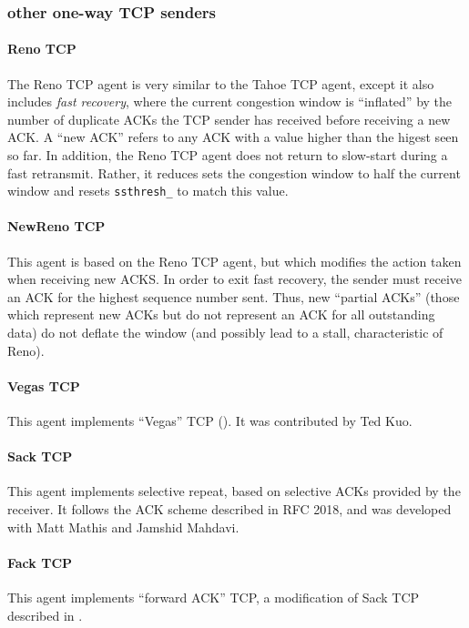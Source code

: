 \documentclass{article}
\begin{document}
\subsubsection{other one-way TCP senders}

\paragraph{Reno TCP}
The Reno TCP agent is very similar to the Tahoe TCP agent,
except it also includes {\em fast recovery}, where the current
congestion window is ``inflated'' by the number of duplicate ACKs
the TCP sender has received before receiving a new ACK.
A ``new ACK'' refers to any ACK with a value higher than the higest
seen so far.
In addition, the Reno TCP agent does not return to slow-start during
a fast retransmit.
Rather, it reduces sets the congestion window to half the current
window and resets {\tt ssthresh\_} to match this value.

\paragraph{NewReno TCP}
This agent is based on the Reno TCP agent, but which modifies the
action taken when receiving new ACKS.
In order to exit fast recovery, the sender must receive an ACK for the
highest sequence number sent.
Thus, new ``partial ACKs'' (those which represent new ACKs but do not
represent an ACK for all outstanding data) do not deflate the window
(and possibly lead to a stall, characteristic of Reno).

\paragraph{Vegas TCP}
This agent implements ``Vegas'' TCP (\cite{vegas}).
It was contributed by Ted Kuo.

\paragraph{Sack TCP}
This agent implements selective repeat, based on selective ACKs provided
by the receiver.
It follows the ACK scheme described in RFC 2018, and was developed
with Matt Mathis and Jamshid Mahdavi.

\paragraph{Fack TCP}
This agent implements ``forward ACK'' TCP, a modification of Sack
TCP described in \cite{matt-jamshid}.
\end{document}
